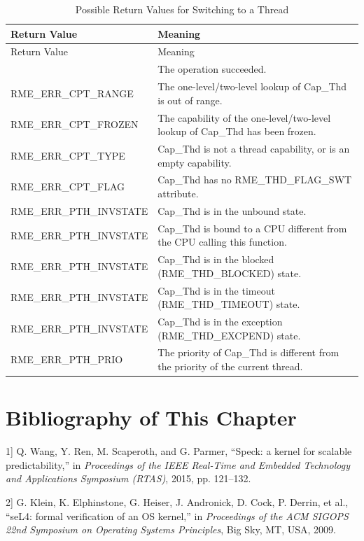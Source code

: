 \begin{xltabular}{\textwidth}{@{}>{\hsize\raggedright\arraybackslash}X>{\hsize\raggedright\arraybackslash}X@{}}
\caption{Possible Return Values for Switching to a Thread}\label{tab:4-37-switch-to-thread-return-values}\\
\toprule
Return Value & Meaning\tabularnewline
\endfirsthead
\toprule
Return Value & Meaning\tabularnewline
\midrule
\endhead
\bottomrule
{} & The operation succeeded.\tabularnewline
    RME\_ERR\_CPT\_RANGE & The one-level/two-level lookup of Cap\_Thd is out of range.\tabularnewline
    RME\_ERR\_CPT\_FROZEN & The capability of the one-level/two-level lookup of Cap\_Thd has been frozen.\tabularnewline
    RME\_ERR\_CPT\_TYPE & Cap\_Thd is not a thread capability, or is an empty capability.\tabularnewline
    RME\_ERR\_CPT\_FLAG & Cap\_Thd has no RME\_THD\_FLAG\_SWT attribute.\tabularnewline
    RME\_ERR\_PTH\_INVSTATE & Cap\_Thd is in the unbound state.\tabularnewline
    RME\_ERR\_PTH\_INVSTATE & Cap\_Thd is bound to a CPU different from the CPU calling this function.\tabularnewline
    RME\_ERR\_PTH\_INVSTATE & Cap\_Thd is in the blocked (RME\_THD\_BLOCKED) state.\tabularnewline
    RME\_ERR\_PTH\_INVSTATE & Cap\_Thd is in the timeout (RME\_THD\_TIMEOUT) state.\tabularnewline
    RME\_ERR\_PTH\_INVSTATE & Cap\_Thd is in the exception (RME\_THD\_EXCPEND) state.\tabularnewline
    RME\_ERR\_PTH\_PRIO & The priority of Cap\_Thd is different from the priority of the current thread.\tabularnewline
\end{xltabular}
\nopagebreak[4]

\section{Bibliography of This Chapter}\label{sec:4-chapter-bibliography}

\protect{}\label{cite:4-1}

\noindent {[}1{]} Q. Wang, Y. Ren, M. Scaperoth, and G. Parmer, ``Speck: a kernel for scalable predictability,'' in \textit{Proceedings of the IEEE Real-Time and Embedded Technology and Applications Symposium (RTAS)}, 2015, pp. 121--132.

\protect{}\label{cite:4-2}

\noindent {[}2{]} G. Klein, K. Elphinstone, G. Heiser, J. Andronick, D. Cock, P. Derrin, et al., ``seL4: formal verification of an OS kernel,'' in \textit{Proceedings of the ACM SIGOPS 22nd Symposium on Operating Systems Principles}, Big Sky, MT, USA, 2009.

